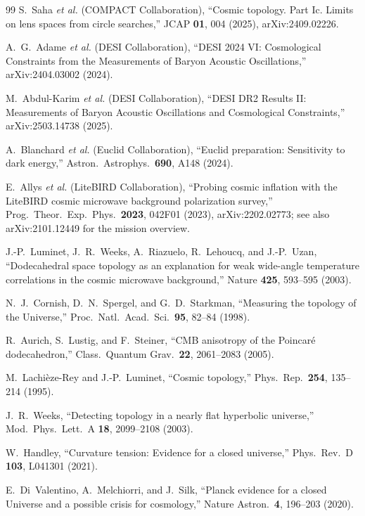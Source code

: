 \documentclass[aps,prd,onecolumn,superscriptaddress,longbibliography,nofootinbib,notitlepage]{revtex4-2}
\begin{document}
\begin{thebibliography}{99}
S.~Saha \textit{et al.} (COMPACT Collaboration),
``Cosmic topology. Part Ic. Limits on lens spaces from circle searches,''
JCAP \textbf{01}, 004 (2025), arXiv:2409.02226.

A.~G.~Adame \textit{et al.} (DESI Collaboration),
``DESI 2024 VI: Cosmological Constraints from the Measurements of
  Baryon Acoustic Oscillations,''
arXiv:2404.03002 (2024).

M.~Abdul-Karim \textit{et al.} (DESI Collaboration),
``DESI DR2 Results II: Measurements of Baryon Acoustic Oscillations and
  Cosmological Constraints,''
arXiv:2503.14738 (2025).

A.~Blanchard \textit{et al.} (Euclid Collaboration),
``Euclid preparation: Sensitivity to dark energy,''
Astron.\ Astrophys.\ \textbf{690}, A148 (2024).

E.~Allys \textit{et al.} (LiteBIRD Collaboration),
``Probing cosmic inflation with the LiteBIRD cosmic microwave background polarization survey,''
Prog.\ Theor.\ Exp.\ Phys.\ \textbf{2023}, 042F01 (2023),
arXiv:2202.02773; see also arXiv:2101.12449 for the mission overview.

J.-P.~Luminet, J.~R.~Weeks, A.~Riazuelo, R.~Lehoucq, and J.-P.~Uzan,
``Dodecahedral space topology as an explanation for weak wide-angle temperature
  correlations in the cosmic microwave background,''
Nature \textbf{425}, 593--595 (2003).

N.~J.~Cornish, D.~N.~Spergel, and G.~D.~Starkman,
``Measuring the topology of the Universe,''
Proc.\ Natl.\ Acad.\ Sci.\ \textbf{95}, 82--84 (1998).

R.~Aurich, S.~Lustig, and F.~Steiner,
``CMB anisotropy of the Poincar\'e dodecahedron,''
Class.\ Quantum Grav.\ \textbf{22}, 2061--2083 (2005).

M.~Lachi\`eze-Rey and J.-P.~Luminet,
``Cosmic topology,''
Phys.\ Rep.\ \textbf{254}, 135--214 (1995).

J.~R.~Weeks,
``Detecting topology in a nearly flat hyperbolic universe,''
Mod.\ Phys.\ Lett.\ A \textbf{18}, 2099--2108 (2003).

W.~Handley,
``Curvature tension: Evidence for a closed universe,''
Phys.\ Rev.\ D \textbf{103}, L041301 (2021).

E.~Di~Valentino, A.~Melchiorri, and J.~Silk,
``Planck evidence for a closed Universe and a possible crisis for cosmology,''
Nature Astron.\ \textbf{4}, 196--203 (2020).


\end{thebibliography}
\end{document}
